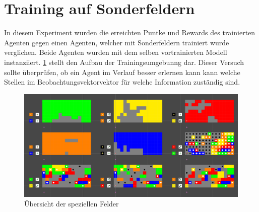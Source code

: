 \newpage
\section{Training auf Sonderfeldern}
In diesem Experiment wurden die erreichten Puntke und Rewards des trainierten Agenten gegen einen Agenten, welcher mit Sonderfeldern trainiert wurde verglichen. Beide Agenten wurden mit dem selben vortrainierten Modell instanziiert. \ref{fig:specialFields} stellt den Aufbau der Trainingsumgebunng dar. Dieser Versuch sollte überprüfen, ob ein Agent im Verlauf besser erlernen kann kann welche Stellen im Beobachtungsvektorvektor für welche Information zuständig sind. 

\begin{figure}[!h]
    \centering
    \includegraphics[scale=0.4]{Bilder/specialFields.png}
    \caption{Übersicht der speziellen Felder}
    \label{fig:specialFields}
\end{figure}

